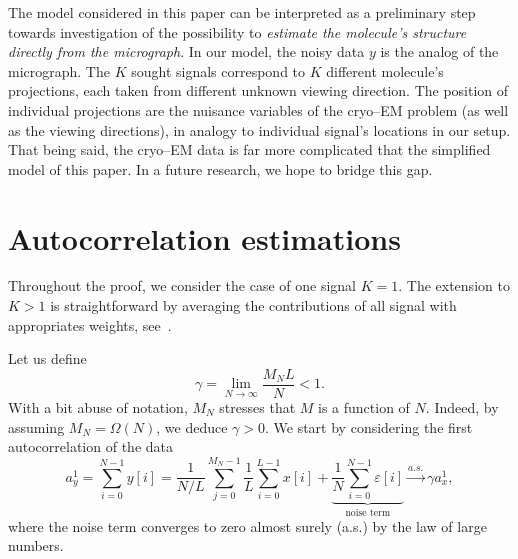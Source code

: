 \documentclass[english,11pt]{article}
\numberwithin{equation}{section}
\theoremstyle{plain}
\theoremstyle{definition}
\theoremstyle{remark}
\theoremstyle{plain}
\theoremstyle{remark}
\theoremstyle{plain}
\theoremstyle{plain}
\begin{document}
The model considered in this paper can be interpreted as a preliminary step towards investigation of the possibility to \emph{estimate the molecule's structure directly from the micrograph}. 
In our model, the noisy data $y$ is the analog of the micrograph. The $K$ sought signals correspond to $K$ different molecule's projections, each taken from  different unknown viewing direction. %
The position of individual projections are the nuisance variables of the cryo--EM problem (as well as the viewing directions), in analogy to individual signal's locations in our setup.
That being said, the cryo--EM data is far more complicated that the simplified model of this paper. In a future research, we hope to bridge this gap.
 
%






\appendix

\section{Autocorrelation estimations} \label{sec:autocorrelation_computation}

Throughout the proof, we consider the case of one signal $K=1$. The extension to $K>1$ is straightforward by averaging the contributions of all signal with  appropriates weights, see~\cite{boumal2017heterogeneous}. 

Let us define
\begin{equation}
\gamma = \lim_{N\to\infty} \frac{M_NL}{N}<1.
\end{equation}
With a bit abuse of notation, $M_N$ stresses that $M$ is a function of $N$. Indeed, by assuming $M_N=\Omega(N)$, we deduce $\gamma>0$.
We start by considering the first autocorrelation of the data
\begin{equation}
a_y^1 = \sum_{i=0}^{N-1} y[i] = \frac{1}{N/L}\sum_{j=0}^{M_N-1}\frac{1}{L}\sum_{i=0}^{L-1}x[i] + \underbrace{\frac{1}{N}\sum_{i=0}^{N-1}\varepsilon[i]}_{\text{noise term}} \xrightarrow{a.s.}\gamma a_x^1,
\end{equation}
where the noise term converges to zero almost surely (a.s.) by the law of large numbers.
\end{document}
